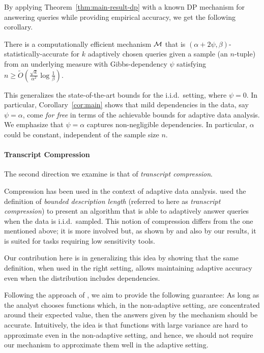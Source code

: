 \documentclass[12pt,a4paper,oneside,onecolumn]{book}
\begin{document}
By applying Theorem~\ref{thm:main-result-dp} with a known DP mechanism for answering queries while providing empirical accuracy, we get the following corollary.

\begin{corollary}\label{cor:main}
There is a computationally efficient mechanism $\mathcal{M}$ that is $(\alpha+2\psi,\beta)$-statistically-accurate for $k$ adaptively chosen queries given a sample (an $n$-tuple) from an underlying measure with Gibbs-dependency $\psi$ satisfying 
$
n\geq \tilde{O}\left( \frac{\sqrt{k}}{\alpha^2}\log\frac{1}{\beta} \right).
$
\end{corollary}

This generalizes the state-of-the-art bounds for the i.i.d.\ setting, where $\psi=0$. In particular, Corollary~\ref{cor:main} shows that mild dependencies in the data, say $\psi=\alpha$, come {\em for free} in terms of the achievable bounds for adaptive data analysis. We emphasize that $\psi=\alpha$ captures non-negligible dependencies. In particular, $\alpha$ could be constant, independent of the sample size $n$.

\paragraph{Transcript Compression}

The second direction we examine is that of \emph{transcript compression}.

Compression has been used in the context of adaptive data analysis. \citet{dwork2015generalization} used the definition of \emph{bounded description length} (referred to here as \emph{transcript compression}) to present an algorithm that is able to adaptively answer queries when the data is i.i.d.\ sampled.
This notion of compression differs from the one mentioned above; it is more involved but, as shown by \citet{dwork2015generalization} and also by our results, it is suited for tasks requiring low sensitivity tools.

Our contribution here is in generalizing this idea by showing that the same definition, when used in the right setting, allows maintaining adaptive accuracy even when the distribution includes dependencies.

Following the approach of \citet{DBLP:journals/corr/BassilyF16}, we aim to provide the following guarantee: 
As long as the analyst chooses functions which, in the non-adaptive setting, are concentrated around their expected value, then the answers given by the mechanism should be accurate. Intuitively, the idea is that functions with large variance are hard to approximate even in the non-adaptive setting, and hence, we should not require our mechanism to approximate them well in the adaptive setting.
\end{document}
